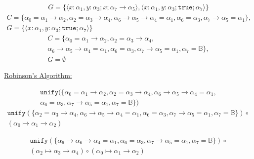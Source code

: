 \documentclass[11pt]{article}
\newcommand{\B}{\mathbb{B}}
\newcommand{\T}{\texttt{true}}
\newcommand{\U}{\texttt{unify}}
\newcommand{\rarr}{\rightarrow}
\begin{document}
\begin{enumerate}
\begin{multline}
		      G = \{  \langle  x: \alpha_1, y:\alpha_3 ; x ; \alpha_7 \rarr \alpha_5  \rangle, \langle x: \alpha_1, y:\alpha_3 ; \T ; \alpha_7 \rangle \}
	      \end{multline}
	      \begin{multline}
		      C = \{ \alpha_0 = \alpha_1 \rarr \alpha_2, \alpha_2 = \alpha_3 \rarr \alpha_4, \alpha_6 \rarr \alpha_5 \rarr \alpha_4 = \alpha_1, \alpha_6 = \alpha_3, \alpha_7 \rarr \alpha_5 = \alpha_1 \},                               \\
		      G = \{ \langle x: \alpha_1, y:\alpha_3 ; \T ; \alpha_7 \rangle \}
	      \end{multline}
	      \begin{multline}
		      C = \{ \alpha_0 = \alpha_1 \rarr \alpha_2, \alpha_2 = \alpha_3 \rarr \alpha_4, \\
		      \alpha_6 \rarr \alpha_5 \rarr \alpha_4 = \alpha_1, \alpha_6 = \alpha_3, \alpha_7 \rarr \alpha_5 = \alpha_1, \alpha_7 = \B \},                \\ 
		      G = \emptyset
	      \end{multline}

	

	\underline{Robinson's Algorithm:}
	
	\begin{multline}
		\U( \{ \alpha_0 = \alpha_1 \rarr \alpha_2, \alpha_2 = \alpha_3 \rarr \alpha_4, \alpha_6 \rarr \alpha_5 \rarr \alpha_4 = \alpha_1, \\ \alpha_6 = \alpha_3, \alpha_7 \rarr \alpha_5 = \alpha_1, \alpha_7 = \B \}) 
	\end{multline}
	\begin{multline}
		\U( \{ \alpha_2 = \alpha_3 \rarr \alpha_4, \alpha_6 \rarr \alpha_5 \rarr \alpha_4 = \alpha_1, \alpha_6 = \alpha_3, \alpha_7 \rarr \alpha_5 = \alpha_1, \alpha_7 = \B \}  ) \circ \\ ( \alpha_0 \mapsto \alpha_1 \rarr \alpha_2 )
	\end{multline}

	\begin{multline}
		\U( \{ \alpha_6 \rarr \alpha_6 \rarr \alpha_4 = \alpha_1, \alpha_6 = \alpha_3, \alpha_7 \rarr \alpha_5 = \alpha_1, \alpha_7 = \B \} )\circ \\ ( \alpha_2 \mapsto \alpha_3 \rarr \alpha_4) \circ ( \alpha_0 \mapsto \alpha_1 \rarr \alpha_2) 
	\end{multline}


\end{enumerate}
\end{document}
